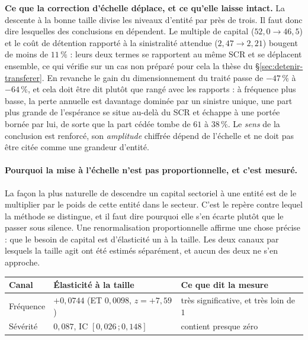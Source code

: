 \begin{attention}
\textbf{Ce que la correction d'échelle déplace, et ce qu'elle laisse intact.} La descente à la
bonne taille divise les niveaux d'entité par près de trois. Il faut donc dire lesquelles des
conclusions en dépendent. Le multiple de capital ($52{,}0 \to 46{,}5$) et le coût de
détention rapporté à la sinistralité attendue ($2{,}47 \to 2{,}21$) bougent de moins de
$11\,\%$ : leurs deux termes se rapportent au même SCR et se déplacent ensemble, ce qui
vérifie sur un cas non préparé pour cela la thèse du \S\ref{sec:detenir-transferer}. En
revanche le gain du dimensionnement du traité passe de $-47\,\%$ à $-64\,\%$, et cela
doit être dit plutôt que rangé avec les rapports : à fréquence plus basse, la perte annuelle
est davantage dominée par un sinistre unique, une part plus grande de l'espérance se situe
au-delà du SCR et échappe à une portée bornée par lui, de sorte que la part cédée tombe de
$61$ à $38\,\%$. Le \emph{sens} de la conclusion est renforcé, son \emph{amplitude} chiffrée
dépend de l'échelle et ne doit pas être citée comme une grandeur d'entité.
\end{attention}

\paragraph{Pourquoi la mise à l'échelle n'est pas proportionnelle, et c'est mesuré.} La façon la
plus naturelle de descendre un capital sectoriel à une entité est de le multiplier par le poids
de cette entité dans le secteur. C'est le repère contre lequel la méthode se distingue, et il
faut dire pourquoi elle s'en écarte plutôt que le passer sous silence. Une renormalisation
proportionnelle affirme une chose précise : que le besoin de capital est d'élasticité
un à la taille. Les deux canaux par lesquels la taille agit ont été estimés séparément, et
aucun des deux ne s'en approche.

\begin{center}\footnotesize
\renewcommand{\arraystretch}{1.25}
\begin{tabular}{@{}l l l@{}}
\toprule
\textbf{Canal} & \textbf{Élasticité à la taille} & \textbf{Ce que dit la mesure} \\
\midrule
Fréquence & $+0{,}0744$ (ET $0{,}0098$, $z=+7{,}59$) & très significative, et très loin de $1$ \\
Sévérité & $0{,}087$, IC $[0{,}026\,;0{,}148]$ & contient presque zéro \\
\bottomrule
\end{tabular}
\end{center}

